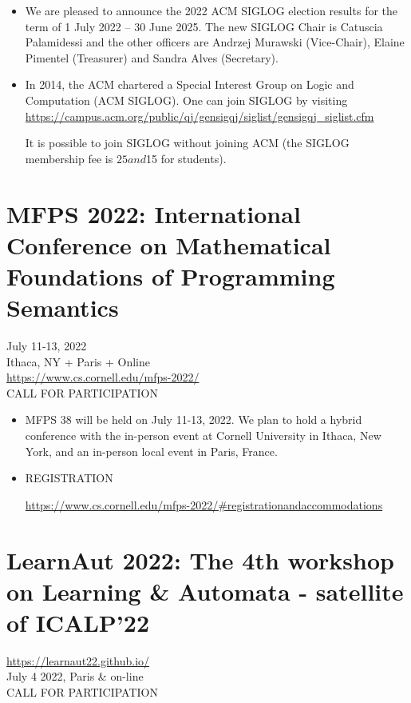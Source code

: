 \documentclass[prodmode,acmtecs]{acmsmall} %
\begin{document}
\begin{itemize}\item  We are pleased to announce the 2022 ACM SIGLOG election results for the term of 1 July 2022 – 30 June 2025. The new SIGLOG Chair is Catuscia Palamidessi and the other officers are Andrzej Murawski (Vice-Chair), Elaine Pimentel (Treasurer) and Sandra Alves (Secretary). 
 
\item  In 2014, the ACM chartered a Special Interest Group on Logic and Computation (ACM SIGLOG). One can join SIGLOG by visiting \href{https://campus.acm.org/public/qj/gensigqj/siglist/gensigqj_siglist.cfm}{https://campus.acm.org/public/qj/gensigqj/siglist/gensigqj\_siglist.cfm}  
 
  It is possible to join SIGLOG without joining ACM (the SIGLOG membership fee is $25 and $15 for students). 
 
\end{itemize}\section{MFPS 2022: International Conference on Mathematical Foundations of Programming Semantics}\label{MFPS2022}  July 11-13, 2022\\ 
  Ithaca, NY + Paris + Online\\ 
  \href{https://www.cs.cornell.edu/mfps-2022/}{https://www.cs.cornell.edu/mfps-2022/}\\ 
CALL FOR PARTICIPATION 

\begin{itemize}\item  MFPS 38 will be held on July 11-13, 2022. We plan to hold a hybrid conference with the in-person event at Cornell University in Ithaca, New York, and an in-person local event in Paris, France.  
 
\item  REGISTRATION 
 
  \href{https://www.cs.cornell.edu/mfps-2022/#registrationandaccommodations}{https://www.cs.cornell.edu/mfps-2022/\#registrationandaccommodations} 
 
\end{itemize}\section{LearnAut 2022: The 4th workshop on Learning \& Automata - satellite of ICALP’22}\label{LearnAut2022}  \href{https://learnaut22.github.io/}{https://learnaut22.github.io/} \\ 
  July 4 2022, Paris \& on-line\\ 
CALL FOR PARTICIPATION 
\end{document}
